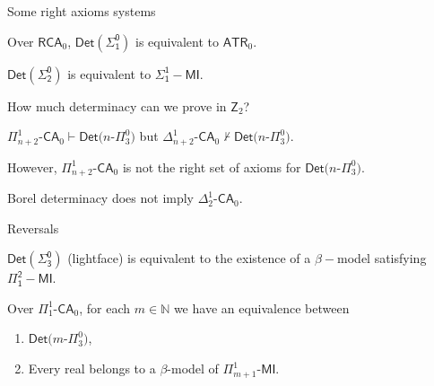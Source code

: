 \documentclass{beamer} %
\begin{document}

\begin{frame}{Some right axioms systems}
    \begin{theorem}
        Over $\mathsf{RCA}_0$, $\mathsf{Det(\Sigma_1^0)}$ is equivalent to $\mathsf{ATR}_0$. 
    \end{theorem}

    \begin{theorem}[Tanaka]
        $\mathsf{Det(\Sigma_2^0)}$ is equivalent to $\mathsf{\Sigma_1^1-MI}$.
    \end{theorem}
\end{frame}


\begin{frame}{How much determinacy can we prove in $\mathsf{Z}_2$?} 
    \begin{theorem}
        $\Pi^1_{n+2}$-$\mathsf{CA}_0 \vdash \mathsf{Det}(n$-$\Pi^0_3)$ but
        $\Delta^1_{n+2}$-$\mathsf{CA}_0 \not\vdash \mathsf{Det}(n$-$\Pi^0_3)$.
    \end{theorem}
    However, $\Pi^1_{n+2}$-$\mathsf{CA}_0$ is not the right set of axioms for 
    $\mathsf{Det}(n$-$\Pi^0_3)$.

    \begin{theorem}
        Borel determinacy does not imply $\Delta^1_2$-$\mathsf{CA}_0$.
    \end{theorem}
\end{frame}


\begin{frame}{Reversals}
 
    \begin{theorem}[Hachtman]
        $\mathsf{Det(\Sigma_3^0)}$ (lightface) is equivalent to the existence of a $\beta-$model 
        satisfying $\mathsf{\Pi_1^2-MI}$.
    \end{theorem}

    \begin{theorem}
        Over $\Pi_1^1$-$\mathsf{CA}_0$, for each $m\in \mathbb{N}$ we have an 
        equivalence between 
        \begin{enumerate}
            \item $\mathsf{Det}(m$-$\Pi_3^0)$,
            \item Every real belongs to a $\beta$-model of $\Pi_{m+1}^1$-$\mathsf{MI}$.
        \end{enumerate}
    \end{theorem}
\end{frame}
\end{document}
